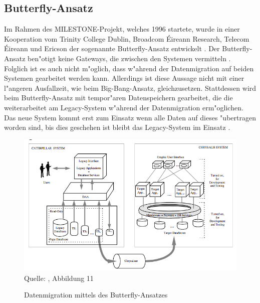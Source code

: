 \subsection{Butterfly-Ansatz}



Im Rahmen des MILESTONE-Projekt, welches 1996 startete, wurde in einer Kooperation vom Trinity College Dublin, Broadcom \'{E}ireann Research, Telecom \'{E}ireann und Ericson der sogenannte Butterfly-Ansatz entwickelt \citep[S.~202]{wuLawlessBisbal-1997}. Der Butterfly-Ansatz ben"otigt keine Gateways, die zwischen den Systemen vermitteln \citep[S.~202]{wuLawlessBisbal-1997}. Folglich ist es auch nicht m"oglich, dass w"ahrend der Datenmigration auf beiden Systemen gearbeitet werden kann. Allerdings ist diese Aussage nicht mit einer l"angeren Ausfallzeit, wie beim Big-Bang-Ansatz, gleichzusetzen. Stattdessen wird beim Butterfly-Ansatz mit tempor"aren Datenspeichern gearbeitet, die die weiterarbeitet am Legacy-System w"ahrend der Datenmigration erm"oglichen. Das neue System kommt erst zum Einsatz wenn alle Daten auf dieses "ubertragen worden sind, bis dies geschehen ist bleibt das Legacy-System im Einsatz \citep[S.~3]{wuLawless-1997}.
\lb
\begin{figure}[h!]
	\centering
	\caption{Datenmigration mittels des Butterfly-Ansatzes}
	\label{pic:datemigration_Butterfly}
	\includegraphics[width=1.0\textwidth]{../images/vorgehensweisen_fig_01.png} \\
	\tiny Quelle: \citep[S.~6]{wuLawless-1997}, Abbildung 11
\end{figure}


